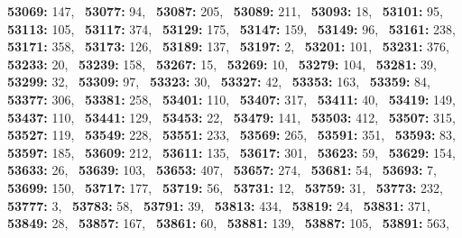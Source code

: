 \textbf{53069:} 147,\allowbreak~ 
\textbf{53077:} 94,\allowbreak~ 
\textbf{53087:} 205,\allowbreak~ 
\textbf{53089:} 211,\allowbreak~ 
\textbf{53093:} 18,\allowbreak~ 
\textbf{53101:} 95,\allowbreak~ 
\textbf{53113:} 105,\allowbreak~ 
\textbf{53117:} 374,\allowbreak~ 
\textbf{53129:} 175,\allowbreak~ 
\textbf{53147:} 159,\allowbreak~ 
\textbf{53149:} 96,\allowbreak~ 
\textbf{53161:} 238,\allowbreak~ 
\textbf{53171:} 358,\allowbreak~ 
\textbf{53173:} 126,\allowbreak~ 
\textbf{53189:} 137,\allowbreak~ 
\textbf{53197:} 2,\allowbreak~ 
\textbf{53201:} 101,\allowbreak~ 
\textbf{53231:} 376,\allowbreak~ 
\textbf{53233:} 20,\allowbreak~ 
\textbf{53239:} 158,\allowbreak~ 
\textbf{53267:} 15,\allowbreak~ 
\textbf{53269:} 10,\allowbreak~ 
\textbf{53279:} 104,\allowbreak~ 
\textbf{53281:} 39,\allowbreak~ 
\textbf{53299:} 32,\allowbreak~ 
\textbf{53309:} 97,\allowbreak~ 
\textbf{53323:} 30,\allowbreak~ 
\textbf{53327:} 42,\allowbreak~ 
\textbf{53353:} 163,\allowbreak~ 
\textbf{53359:} 84,\allowbreak~ 
\textbf{53377:} 306,\allowbreak~ 
\textbf{53381:} 258,\allowbreak~ 
\textbf{53401:} 110,\allowbreak~ 
\textbf{53407:} 317,\allowbreak~ 
\textbf{53411:} 40,\allowbreak~ 
\textbf{53419:} 149,\allowbreak~ 
\textbf{53437:} 110,\allowbreak~ 
\textbf{53441:} 129,\allowbreak~ 
\textbf{53453:} 22,\allowbreak~ 
\textbf{53479:} 141,\allowbreak~ 
\textbf{53503:} 412,\allowbreak~ 
\textbf{53507:} 315,\allowbreak~ 
\textbf{53527:} 119,\allowbreak~ 
\textbf{53549:} 228,\allowbreak~ 
\textbf{53551:} 233,\allowbreak~ 
\textbf{53569:} 265,\allowbreak~ 
\textbf{53591:} 351,\allowbreak~ 
\textbf{53593:} 83,\allowbreak~ 
\textbf{53597:} 185,\allowbreak~ 
\textbf{53609:} 212,\allowbreak~ 
\textbf{53611:} 135,\allowbreak~ 
\textbf{53617:} 301,\allowbreak~ 
\textbf{53623:} 59,\allowbreak~ 
\textbf{53629:} 154,\allowbreak~ 
\textbf{53633:} 26,\allowbreak~ 
\textbf{53639:} 103,\allowbreak~ 
\textbf{53653:} 407,\allowbreak~ 
\textbf{53657:} 274,\allowbreak~ 
\textbf{53681:} 54,\allowbreak~ 
\textbf{53693:} 7,\allowbreak~ 
\textbf{53699:} 150,\allowbreak~ 
\textbf{53717:} 177,\allowbreak~ 
\textbf{53719:} 56,\allowbreak~ 
\textbf{53731:} 12,\allowbreak~ 
\textbf{53759:} 31,\allowbreak~ 
\textbf{53773:} 232,\allowbreak~ 
\textbf{53777:} 3,\allowbreak~ 
\textbf{53783:} 58,\allowbreak~ 
\textbf{53791:} 39,\allowbreak~ 
\textbf{53813:} 434,\allowbreak~ 
\textbf{53819:} 24,\allowbreak~ 
\textbf{53831:} 371,\allowbreak~ 
\textbf{53849:} 28,\allowbreak~ 
\textbf{53857:} 167,\allowbreak~ 
\textbf{53861:} 60,\allowbreak~ 
\textbf{53881:} 139,\allowbreak~ 
\textbf{53887:} 105,\allowbreak~ 
\textbf{53891:} 563,\allowbreak~ 
